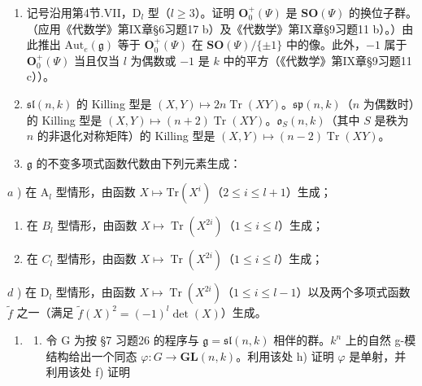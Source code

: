 \begin{enumerate}
\def\labelenumi{\arabic{enumi})}
\setcounter{enumi}{10}
\item
  记号沿用第4节.VII，\(\mathrm{D}_l\) 型（\(l \geq 3\)）。证明 \(\mathbf{O}_0^+(\varPsi)\) 是 \(\mathbf{SO}(\varPsi)\) 的换位子群。（应用《代数学》第IX章§6习题17 b）及《代数学》第IX章§9习题11 b）。）由此推出 \(\mathrm{Aut}_e(\mathfrak{g})\) 等于 \(\mathbf{O}_0^+(\varPsi)\) 在 \(\mathbf{SO}(\varPsi)/\{\pm 1\}\) 中的像。此外，\(-1\) 属于 \(\mathbf{O}_0^+(\varPsi)\) 当且仅当 \(l\) 为偶数或 \(-1\) 是 \(k\) 中的平方（《代数学》第IX章§9习题11 c））。
\item
  \(\mathfrak{sl}(n,k)\) 的 Killing 型是 \((X,Y)\mapsto 2n\operatorname {Tr}(XY)\)。\(\mathfrak{sp}(n,k)\)（\(n\) 为偶数时）的 Killing 型是 \((X,Y)\mapsto (n + 2)\operatorname {Tr}(XY)\)。\(\mathfrak{o}_S(n,k)\)（其中 \(S\) 是秩为 \(n\) 的非退化对称矩阵）的 Killing 型是 \((X,Y)\mapsto (n - 2)\operatorname {Tr}(XY)\)。
\item
  \(\mathfrak{g}\) 的不变多项式函数代数由下列元素生成：
\end{enumerate}

\(a\) ) 在 \(\mathrm{A}_l\) 型情形，由函数 \(X\mapsto \mathrm{Tr}(X^i)\)（\(2\leq i\leq l + 1\)）生成；

\begin{enumerate}
\def\labelenumi{\alph{enumi})}
\setcounter{enumi}{1}
\item
  在 \(B_{l}\) 型情形，由函数 \(X \mapsto \operatorname{Tr}(X^{2i})\)（\(1 \leq i \leq l\)）生成；
\item
  在 \(C_{l}\) 型情形，由函数 \(X \mapsto \operatorname{Tr}(X^{2i})\)（\(1 \leq i \leq l\)）生成；
\end{enumerate}

\(d\) ) 在 \(\mathrm{D}_l\) 型情形，由函数 \(X \mapsto \operatorname{Tr}(X^{2i})\)（\(1 \leq i \leq l - 1\)）以及两个多项式函数 \(\tilde{f}\) 之一（满足 \(\tilde{f}(X)^2 = (-1)^l \det(X)\)）生成。

\begin{enumerate}
\def\labelenumi{\arabic{enumi})}
\setcounter{enumi}{13}
\tightlist
\item
  \begin{enumerate}
  \def\labelenumii{\alph{enumii})}
  \tightlist
  \item
    令 G 为按 §7 习题26 的程序与 \(\mathfrak{g} = \mathfrak{sl}(n, k)\) 相伴的群。\(k^{n}\) 上的自然 g-模结构给出一个同态 \(\varphi : G \to \mathbf{GL}(n, k)\)。利用该处 h) 证明 \(\varphi\) 是单射，并利用该处 f) 证明
  \end{enumerate}
\end{enumerate}

